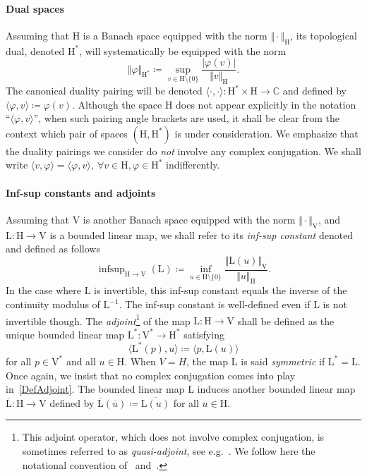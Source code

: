 \documentclass[a4paper,11pt]{article}
\newcommand{\mrm}{\mathrm}
\newcommand{\mL}{\mathrm{L}}
\newcommand{\mH}{\mathrm{H}}
\newcommand{\mV}{\mathrm{V}}
\newcommand{\infsup}{\mathop{\mrm{infsup}}}
\begin{document}
\paragraph{Dual spaces} Assuming that $\mH$ is a Banach space equipped with the
norm $\Vert \cdot\Vert_{\mH}$, its topological dual, denoted $\mH^{*}$, 
will systematically be equipped with the norm
\begin{equation*}
  \Vert \varphi\Vert_{\mH^{*}} \coloneq
  \sup_{v\in \mH\setminus\{0\}} \frac{\vert \varphi(v) \vert}{\Vert v\Vert_{\mH}}.
\end{equation*}
The canonical duality pairing will be denoted
$\langle \cdot,\cdot\rangle\colon \mH^{*}\times\mH\to \mathbb{C}$ and
defined by $\langle \varphi, v\rangle\coloneq \varphi(v)$. Although
the space $\mH$ does not appear explicitly in the notation
``$\langle \varphi, v\rangle$'', when such pairing angle brackets
are used, it shall be clear from the context which pair of spaces
$(\mH,\mH^{*})$ is under consideration. We emphasize
that the duality pairings we consider do \emph{not} involve any
complex conjugation. We shall write $\langle v,\varphi\rangle =
\langle \varphi, v\rangle,\ \forall v\in\mH, \varphi\in \mH^*$ indifferently.

\paragraph{Inf-sup constants and adjoints}
Assuming that $\mV$ is another Banach space
equipped with the norm $\Vert \cdot\Vert_{\mV}$,
and $\mL\colon\mH\to \mV$ is a bounded linear map, we shall
refer to its \emph{inf-sup constant} denoted and defined as follows
\begin{equation}\label{DefInfSupCst}
  \infsup_{\mH\to \mV}(\mL)\coloneq\inf_{u\in \mH\setminus\{0\}}
  \frac{\Vert \mL(u)\Vert_{\mV}}{\Vert u\Vert_{\mH}}.
\end{equation}
In the case where $\mL$ is invertible, this inf-sup constant
equals the inverse of the continuity modulus of $\mL^{-1}$.
The inf-sup constant is well-defined even if $\mL$ is not
invertible though. The \emph{adjoint}\footnote{This adjoint operator, which does not involve complex conjugation, is sometimes referred to as \emph{quasi-adjoint}, see e.g.~\cite{ChandlerWildeGrahamEtAl2012NAB}. We follow here the notational convention of~\cite[\S2.6]{Brezis2011FAS} and~\cite[\S4.10]{Rudin19991book}.} of the map $\mL\colon\mH\to \mV$ shall be
defined as the unique bounded linear map $\mL^*\colon\mV^{*}\to \mH^{*}$
satisfying
\begin{equation}\label{DefAdjoint}
  \langle \mL^{*}(p),u\rangle \coloneq 
  \langle p,\mL(u)\rangle 
\end{equation}
for all $p\in \mV^*$ and all $u\in\mH$. When \(V=H\), the map \(\mL\) is said \emph{symmetric} if \(\mL^* = \mL\). Once again, we insist that
no complex conjugation comes into play in~\eqref{DefAdjoint}. The bounded
linear map $\mL$ induces another bounded linear map
$\overline{\mL}\colon\mH\to \mV$ defined by $\overline{\mL}(\overline{u})\coloneq\overline{\mL(u)}$
for all $u\in\mH$.
\end{document}

